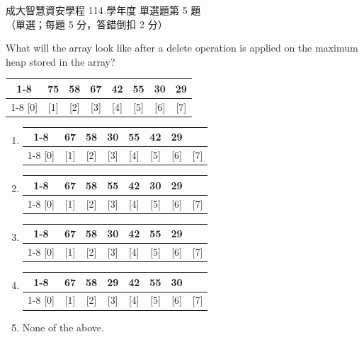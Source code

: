 \begin{pastexam}[label={px:ncku-114-isec-ds-05}]{成大智慧資安學程 114 學年度 單選題第 5 題}
（單選；每題 5 分，答錯倒扣 2 分）

What will the array look like after a delete operation is applied on the maximum heap stored in the
array?

\begin{center}
\begin{tabular}{*{8}{c}}
\cline{1-8}
\multicolumn{1}{|c|}{-} & \multicolumn{1}{c|}{75} & \multicolumn{1}{c|}{58} & \multicolumn{1}{c|}{67} & \multicolumn{1}{c|}{42} & \multicolumn{1}{c|}{55} & \multicolumn{1}{c|}{30} & \multicolumn{1}{c|}{29} \\
\cline{1-8}
[0] & [1] & [2] & [3] & [4] & [5] & [6] & [7]
\end{tabular}
\end{center}
\begin{enumerate}[label=\alph*)]
\item \begin{tabular}{*{8}{c}}
\cline{1-8}
\multicolumn{1}{|c|}{-} & \multicolumn{1}{c|}{67} & \multicolumn{1}{c|}{58} & \multicolumn{1}{c|}{30} & \multicolumn{1}{c|}{55} & \multicolumn{1}{c|}{42} & \multicolumn{1}{c|}{29} & \multicolumn{1}{c|}{ } \\
\cline{1-8}
[0] & [1] & [2] & [3] & [4] & [5] & [6] & [7]
\end{tabular}
\item \begin{tabular}{*{8}{c}}
\cline{1-8}
\multicolumn{1}{|c|}{-} & \multicolumn{1}{c|}{67} & \multicolumn{1}{c|}{58} & \multicolumn{1}{c|}{55} & \multicolumn{1}{c|}{42} & \multicolumn{1}{c|}{30} & \multicolumn{1}{c|}{29} & \multicolumn{1}{c|}{ } \\
\cline{1-8}
[0] & [1] & [2] & [3] & [4] & [5] & [6] & [7]
\end{tabular}
\item \begin{tabular}{*{8}{c}}
\cline{1-8}
\multicolumn{1}{|c|}{-} & \multicolumn{1}{c|}{67} & \multicolumn{1}{c|}{58} & \multicolumn{1}{c|}{30} & \multicolumn{1}{c|}{42} & \multicolumn{1}{c|}{55} & \multicolumn{1}{c|}{29} & \multicolumn{1}{c|}{ } \\
\cline{1-8}
[0] & [1] & [2] & [3] & [4] & [5] & [6] & [7]
\end{tabular}
\item \begin{tabular}{*{8}{c}}
\cline{1-8}
\multicolumn{1}{|c|}{-} & \multicolumn{1}{c|}{67} & \multicolumn{1}{c|}{58} & \multicolumn{1}{c|}{29} & \multicolumn{1}{c|}{42} & \multicolumn{1}{c|}{55} & \multicolumn{1}{c|}{30} & \multicolumn{1}{c|}{ } \\
\cline{1-8}
[0] & [1] & [2] & [3] & [4] & [5] & [6] & [7]
\end{tabular}
\item None of the above.
\end{enumerate}
\end{pastexam}

